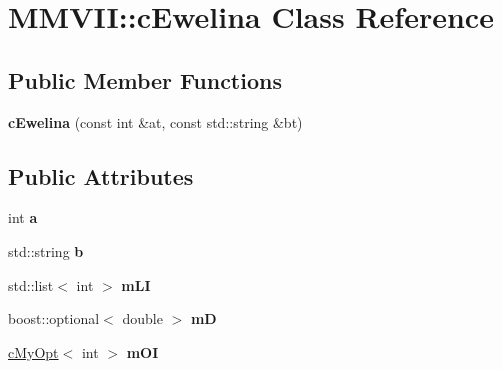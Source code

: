 \hypertarget{classMMVII_1_1cEwelina}{}\section{M\+M\+V\+II\+:\+:c\+Ewelina Class Reference}
\label{classMMVII_1_1cEwelina}
\subsection*{Public Member Functions}
\begin{DoxyCompactItemize}
\item 
{\bfseries c\+Ewelina} (const int \&at, const std\+::string \&bt)\hypertarget{classMMVII_1_1cEwelina_a0c5dc70c3cca297d8cb83b97d871e26c}{}\label{classMMVII_1_1cEwelina_a0c5dc70c3cca297d8cb83b97d871e26c}

\end{DoxyCompactItemize}
\subsection*{Public Attributes}
\begin{DoxyCompactItemize}
\item 
int {\bfseries a}\hypertarget{classMMVII_1_1cEwelina_ae47c4a6377894446c2c9ad201937a465}{}\label{classMMVII_1_1cEwelina_ae47c4a6377894446c2c9ad201937a465}

\item 
std\+::string {\bfseries b}\hypertarget{classMMVII_1_1cEwelina_af97b5c3dec712406b8d10a433ca57ac7}{}\label{classMMVII_1_1cEwelina_af97b5c3dec712406b8d10a433ca57ac7}

\item 
std\+::list$<$ int $>$ {\bfseries m\+LI}\hypertarget{classMMVII_1_1cEwelina_aa577cc88f663d2fe258408158db4d5cb}{}\label{classMMVII_1_1cEwelina_aa577cc88f663d2fe258408158db4d5cb}

\item 
boost\+::optional$<$ double $>$ {\bfseries mD}\hypertarget{classMMVII_1_1cEwelina_a22213b196b3d6be256491c8f554dd0cb}{}\label{classMMVII_1_1cEwelina_a22213b196b3d6be256491c8f554dd0cb}

\item 
\hyperlink{classMMVII_1_1cMyOpt}{c\+My\+Opt}$<$ int $>$ {\bfseries m\+OI}\hypertarget{classMMVII_1_1cEwelina_a0fd15b6e5022a5605a4a9085443a6fd0}{}\label{classMMVII_1_1cEwelina_a0fd15b6e5022a5605a4a9085443a6fd0}

\end{DoxyCompactItemize}
